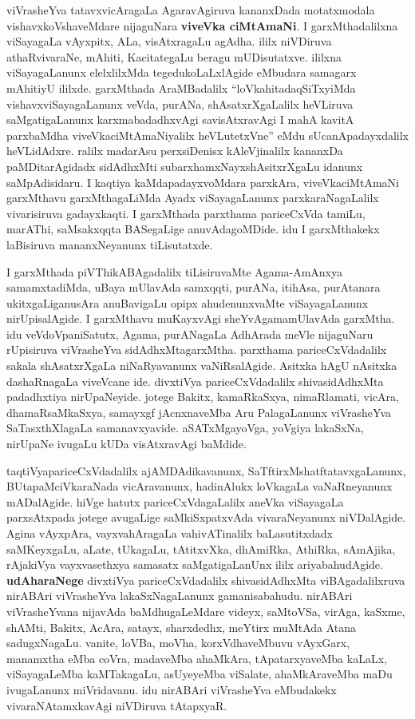 viVrasheYva tatavxvicAragaLa AgaravAgiruva kananxDada motatxmodala vishavxkoVshaveMdare nijaguNara \textbf{viveVka ciMtAmaNi}. I garxMthadalilxna viSayagaLa vAyxpitx, ALa, visAtxragaLu agAdha. ililx niVDiruva athaRvivaraNe, mAhiti, KacitategaLu beragu mUDisu\-tatxve. ililxna viSayagaLanunx elelxlilxMda tegedukoLaLxlAgide eMbudara samagarx mAhitiyU ililxde. garxMthada AraMBadalilx ``loVka\-hitadaqSiTxyiMda vishavxviSayagaLanunx veVda, purANa, shAsatxrXgaLalilx heVLiruva saMgatigaLanunx karxmabadadhxvAgi savisAtxravAgi I mahA kavitA parxbaMdha viveVkaciMtAmaNiyalilx heVLutetxVne'' eMdu sUcanApadayxdalilx heVLidAdxre. ralilx madarAsu perxsiDenisx kAleVjinalilx kananxDa paMDitarAgidadx sidAdhxMti subarxhamxNayxshAsitxrXgaLu idanunx saMpAdisidaru. I kaqtiya kaMdapadayxvoMdara parxkAra, viveVka\-ciMtAmaNi garxMthavu  garxMthagaLiMda Ayadx  viSayagaLanunx  parxkaraNagaLalilx vivarisiruva gadayxkaqti. I garxMthada parxthama pariceCxVda tamiLu, marAThi, saMsakxqqta BASegaLige anuvAdagoMDide. idu I garxMthakekx laBisiruva mananxNeyanunx tiLisutatxde.

I garxMthada piVThikABAgadalilx tiLisiruvaMte Agama-AmAnxya samamxtadiMda, uBaya mUlavAda samxqqti, purANa, itihAsa, purAtanara ukitxgaLiganusAra anuBavigaLu opipx ahudenunxvaMte viSayagaLanunx nirUpisalAgide. I garxMthavu muKayxvAgi sheYvAgamamUlavAda garxMtha. idu veVdoVpaniSatutx, Agama, purANagaLa AdhArada meVle nijaguNaru rUpisiruva viVrasheYva sidAdhxMtagarxMtha. parxthama pariceCxVdadalilx sakala shAsatxrXgaLa niNaRyavanunx vaNiRsalAgide. Asitxka hAgU nAsitxka dashaRnagaLa viveVcane ide. divxtiVya pariceCxVdadalilx shivasidAdhxMta padadhxtiya nirUpaNeyide. jotege Bakitx, kamaRkaSxya, nimaRlamati, vicAra, dhamaRsaMkaSxya, samayxgf jAcnxnaveMba Aru PalagaLanunx viVrasheYva SaTasxthXlagaLa samanavxyavide. aSATxMgayoVga, yoVgiya lakaSxNa, nirUpaNe ivugaLu kUDa visAtxravAgi baMdide.

taqtiVyapariceCxVdadalilx ajAMDAdikavanunx, SaTftirxMshatftatavxgaLanunx, BUtapaMciVkaraNada vicAravanunx, hadinAlukx loVka\-gaLa vaNaRne\-yanunx mADalAgide. hiVge hatutx pariceCxVdagaLalilx aneVka viSayagaLa parxsAtxpada jotege avugaLige saMkiSxpatxvAda vivaraNeyanunx niVDalAgide. Agina vAyxpAra, vayxvahAragaLa vahivATinalilx baLasutitxdadx saMKeyxgaLu, aLate, tUkagaLu, tAtitxvXka, dhAmiRka, AthiRka, sAmAjika, rAjakiVya vayxvasethxya samasatx saMgatigaLanUnx ililx ariyabahudAgide. \textbf{udAharaNege} divxtiVya pariceCxVdadalilx shivasidAdhxMta viBAgadalilxruva nirABAri viVrasheYva lakaSxNagaLanunx gamanisabahudu. nirABAri viVrasheYvana nijavAda baMdhugaLeMdare videyx, saMtoVSa, virAga, kaSxme, shAMti, Bakitx, AcAra, satayx, sharxdedhx, meYtirx muMtAda Atana sadugxNagaLu. vanite, loVBa, moVha, korxVdhaveMbuvu vAyxGarx, manamxtha eMba coVra, madaveMba ahaMkAra, tApatarxyaveMba kaLaLx, viSayagaLeMba kaMTakagaLu, asUyeyeMba viSalate, ahaMkAraveMba maDu ivugaLanunx miVridavanu. idu nirABAri viVrasheYva eMbudakekx vivaraNAtamxkavAgi niVDiruva tAtapxyaR.

